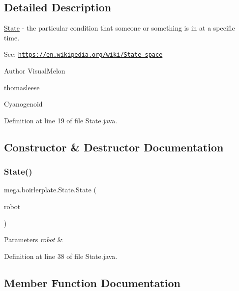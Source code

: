 \subsection{Detailed Description}
\hyperlink{classmega_1_1boirlerplate_1_1_state}{State} -\/ the particular condition that someone or something is in at a specific time.

See\+: \href{https://en.wikipedia.org/wiki/State_space}{\tt https\+://en.\+wikipedia.\+org/wiki/\+State\+\_\+space}

\begin{DoxyAuthor}{Author}
Visual\+Melon 

thomasleese 

Cyanogenoid 
\end{DoxyAuthor}


Definition at line 19 of file State.\+java.



\subsection{Constructor \& Destructor Documentation}
\mbox{\label{classmega_1_1boirlerplate_1_1_state_a19a49e8e63e25e857701db1fb232c4e6}} 
\subsubsection{\texorpdfstring{State()}{State()}}
{\footnotesize\ttfamily mega.\+boirlerplate.\+State.\+State (\begin{DoxyParamCaption}\item[{Advanced\+Robot}]{robot }\end{DoxyParamCaption})}


\begin{DoxyParams}{Parameters}
{\em robot} & \\
\hline
\end{DoxyParams}


Definition at line 38 of file State.\+java.



\subsection{Member Function Documentation}
\mbox{\label{classmega_1_1boirlerplate_1_1_state_a7fe93033ef2498bcd8d8d5c0d777d816}} 
